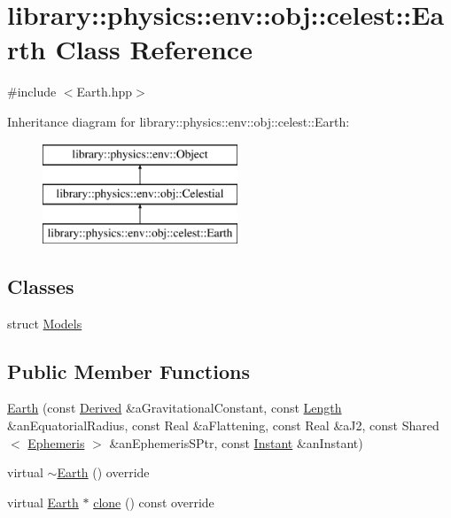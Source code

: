 \hypertarget{classlibrary_1_1physics_1_1env_1_1obj_1_1celest_1_1_earth}{}\section{library\+:\+:physics\+:\+:env\+:\+:obj\+:\+:celest\+:\+:Earth Class Reference}
\label{classlibrary_1_1physics_1_1env_1_1obj_1_1celest_1_1_earth}


{\ttfamily \#include $<$Earth.\+hpp$>$}

Inheritance diagram for library\+:\+:physics\+:\+:env\+:\+:obj\+:\+:celest\+:\+:Earth\+:\begin{figure}[H]
\begin{center}
\leavevmode
\includegraphics[height=3.000000cm]{classlibrary_1_1physics_1_1env_1_1obj_1_1celest_1_1_earth}
\end{center}
\end{figure}
\subsection*{Classes}
\begin{DoxyCompactItemize}
\item 
struct \hyperlink{structlibrary_1_1physics_1_1env_1_1obj_1_1celest_1_1_earth_1_1_models}{Models}
\end{DoxyCompactItemize}
\subsection*{Public Member Functions}
\begin{DoxyCompactItemize}
\item 
\hyperlink{classlibrary_1_1physics_1_1env_1_1obj_1_1celest_1_1_earth_a43e41a95f19ee7a3043a17e69b4ec33c}{Earth} (const \hyperlink{classlibrary_1_1physics_1_1units_1_1_derived}{Derived} \&a\+Gravitational\+Constant, const \hyperlink{classlibrary_1_1physics_1_1units_1_1_length}{Length} \&an\+Equatorial\+Radius, const Real \&a\+Flattening, const Real \&a\+J2, const Shared$<$ \hyperlink{classlibrary_1_1physics_1_1env_1_1_ephemeris}{Ephemeris} $>$ \&an\+Ephemeris\+S\+Ptr, const \hyperlink{classlibrary_1_1physics_1_1time_1_1_instant}{Instant} \&an\+Instant)
\item 
virtual \hyperlink{classlibrary_1_1physics_1_1env_1_1obj_1_1celest_1_1_earth_a93fbd2015a7c7d786654919197c63963}{$\sim$\+Earth} () override
\item 
virtual \hyperlink{classlibrary_1_1physics_1_1env_1_1obj_1_1celest_1_1_earth}{Earth} $\ast$ \hyperlink{classlibrary_1_1physics_1_1env_1_1obj_1_1celest_1_1_earth_aca39bec00a2046a3fcef9bf22be52428}{clone} () const override
\end{DoxyCompactItemize}
